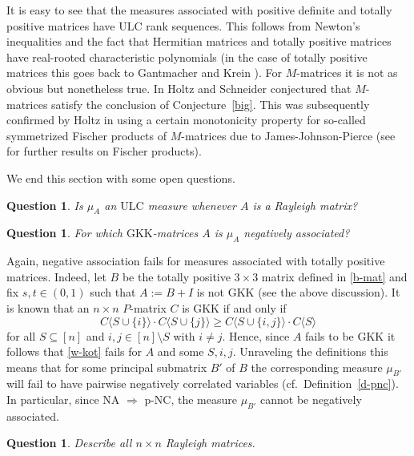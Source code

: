 \documentclass[10pt,reqno]{amsart}
\theoremstyle{plain}
\newtheorem{question}[problem]{Question}
\theoremstyle{definition}
\theoremstyle{remark}
\newcommand{\ULC}{\text{ULC}}
\newcommand{\GKK}{\text{GKK}}
\begin{document}
It is easy to see that the measures associated with positive definite and
totally positive matrices have $\ULC$ rank sequences. This follows from
Newton's inequalities and the fact that 
Hermitian matrices and totally positive matrices have real-rooted
characteristic polynomials (in the case of totally positive matrices this
goes back to Gantmacher and Krein \cite{GK}). For $M$-matrices it is not
as obvious but nonetheless true.
In \cite{HS} Holtz and Schneider conjectured that $M$-matrices satisfy the
conclusion of Conjecture~\ref{big}. This was subsequently confirmed by Holtz
in \cite{HM} using a certain monotonicity property for so-called
symmetrized Fischer 
products of $M$-matrices due to James-Johnson-Pierce \cite{JJP} (see 
\cite{BBS1} for further results on Fischer products).

We end this section with some open questions.

\begin{question}
Is $\mu_A$ an $\ULC$ measure whenever $A$ is a Rayleigh matrix?
\end{question}

\begin{question}
For which $\GKK$-matrices $A$ is $\mu_A$ negatively associated?
\end{question}

Again, negative association fails for measures associated with 
totally positive matrices. Indeed,
let $B$ be the totally positive $3\times 3$ matrix defined in \eqref{b-mat} 
and fix $s,t\in (0,1)$ such that $A:=B+I$ is not $\GKK$ (see the above 
discussion). 
It is known \cite{Ca,GK} that an $n \times n$
$P$-matrix $C$ is $\GKK$ if and only if
\begin{equation}\label{w-kot}
C\langle S \cup\{i\} \rangle \cdot C\langle S \cup\{j\} \rangle \geq
C\langle S \cup\{i,j\} \rangle \cdot C\langle S  \rangle
\end{equation}
for all $S \subseteq [n]$ and $i,j\in [n]\setminus S$ with $i\neq j$.  
Hence, since
$A$ fails to be $\GKK$ it follows that
\eqref{w-kot} fails for $A$ and some $S, i,j$. Unraveling the definitions 
this means that for some principal submatrix $B'$ of
$B$ the corresponding measure $\mu_{B'}$ will fail to have pairwise negatively
correlated variables (cf.~Definition~\ref{d-pnc}). In particular, since
NA $\Rightarrow$ p-NC, the measure $\mu_{B'}$ cannot be negatively 
associated. 

\begin{question}
Describe all $n\times n$ Rayleigh  matrices.
\end{question}
\end{document}
